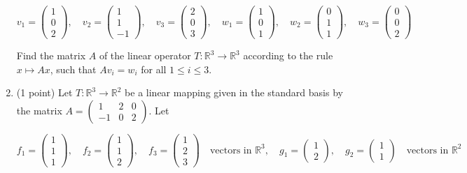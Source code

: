 \documentclass{article}
\begin{document}
\begin{enumerate}
  \[
  v_1 = \begin{pmatrix} 1 \\ 0 \\ 2 \end{pmatrix}, \quad
  v_2 = \begin{pmatrix} 1 \\ 1 \\ -1 \end{pmatrix}, \quad
  v_3 = \begin{pmatrix} 2 \\ 0 \\ 3 \end{pmatrix}, \quad
  w_1 = \begin{pmatrix} 1 \\ 0 \\ 1 \end{pmatrix}, \quad
  w_2 = \begin{pmatrix} 0 \\ 1 \\ 1 \end{pmatrix}, \quad
  w_3 = \begin{pmatrix} 0 \\ 0 \\ 2 \end{pmatrix}
  \]
  
  Find the matrix $A$ of the linear operator $T: \mathbb{R}^3 \to \mathbb{R}^3$ 
  according to the rule $x \mapsto Ax$, such that $Av_i = w_i$ for all $1 \leq i \leq 3$.
  
\item (1 point) Let $T: \mathbb{R}^3 \to \mathbb{R}^2$ be a linear mapping given 
in the standard basis by the matrix 
$A = \begin{pmatrix} 1 & 2 & 0 \\ -1 & 0 & 2 \end{pmatrix}$. Let


\[
f_1 = \begin{pmatrix} 1 \\ 1 \\ 1 \end{pmatrix}, \quad
f_2 = \begin{pmatrix} 1 \\ 1 \\ 2 \end{pmatrix}, \quad
f_3 = \begin{pmatrix} 1 \\ 2 \\ 3 \end{pmatrix} \quad \text{vectors in } \mathbb{R}^3, \quad
g_1 = \begin{pmatrix} 1 \\ 2 \end{pmatrix}, \quad
g_2 = \begin{pmatrix} 1 \\ 1 \end{pmatrix} \quad \text{vectors in } \mathbb{R}^2
\]


\end{enumerate}
\end{document}
